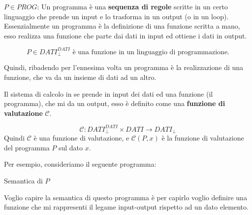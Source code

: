 \documentclass{article}
\begin{document}
\begin{figure}[H]
    \centering
\end{figure}

$P\in PROG$: Un programma è una \textbf{sequenza di regole} scritte in un certo linguaggio
che prende un input e lo trasforma in un output (o in un loop).
Essenzialmente un programma è la definizione di una funzione scritta a mano, esso
realizza una funzione che parte dai dati in input ed ottiene i dati in output.

$$P\in DATI_{\bot}^{DATI}\text{ è una funzione in un linguaggio di programmazione.}$$

Quindi, ribadendo per l'ennesima volta un programma è la realizzazione di una
funzione, che va da un insieme di dati ad un altro.

Il sistema di calcolo in se prende in input dei dati ed una funzione (il programma),
che mi da un output, esso è definito come una \textbf{funzione di valutazione} $\mathcal{C}$.

$$\mathcal{C}:DATI_{\bot}^{DATI}\times DATI\rightarrow DATI_{\bot}$$
Quindi $\mathcal{C}$ è una funzione di valutazione, e $\mathcal{C}(P,x)$ è la funzione di valutazione
del programma $P$ sul dato $x$.

Per esempio, consideriamo il seguente programma:

\begin{algorithm}[H]
    {
    }

    \caption{Semantica di $P$}
\end{algorithm}

Voglio capire la semantica di questo programma è per capirlo voglio definire una
funzione che mi rappresenti il legame input-output rispetto ad un dato elemento.
\end{document}
